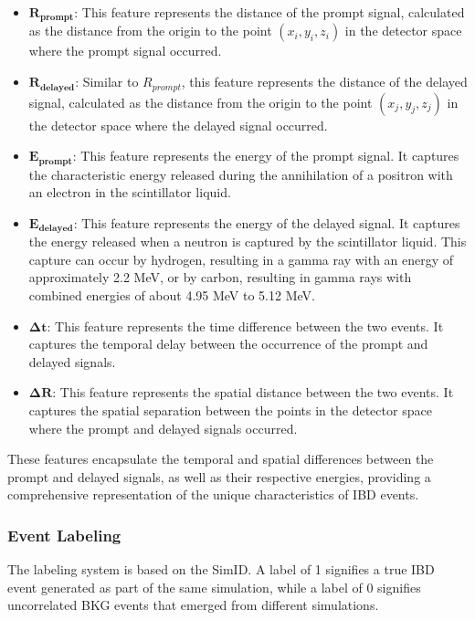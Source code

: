 \begin{itemize}
	 
	\item $\mathbf{R_{prompt}}$: This feature represents the distance of the prompt signal, calculated as the distance from the origin to the point $(x_i, y_i, z_i)$ in the detector space where the prompt signal occurred.	
	
	\item $\mathbf{R_{delayed}}$: Similar to $R_{prompt}$, this feature represents the distance of the delayed signal, calculated as the distance from the origin to the point $(x_j, y_j, z_j)$ in the detector space where the delayed signal occurred.

	\item $\mathbf{E_{prompt}}$: This feature represents the energy of the prompt signal. It captures the characteristic energy released during the annihilation of a positron with an electron in the scintillator liquid.

	\item $\mathbf{E_{delayed}}$: This feature represents the energy of the delayed signal. It captures the energy released when a neutron is captured by the scintillator liquid. This capture can occur by hydrogen, resulting in a gamma ray with an energy of approximately 2.2 MeV, or by carbon, resulting in gamma rays with combined energies of about 4.95 MeV to 5.12 MeV.

	\item $\mathbf{\Delta t}$: This feature represents the time difference between the two events. It captures the temporal delay between the occurrence of the prompt and delayed signals.

	\item $\mathbf{\Delta R}$: This feature represents the spatial distance between the two events. It captures the spatial separation between the points in the detector space where the prompt and delayed signals occurred.

\end{itemize}
These features encapsulate the temporal and spatial differences between the prompt and delayed signals, as well as their respective energies, providing a comprehensive representation of the unique characteristics of IBD events.


\subsubsection*{Event Labeling}
The labeling system is based on the SimID. A label of 1 signifies a true IBD event generated as part of the same simulation, while a label of 0 signifies uncorrelated BKG events that emerged from different simulations.


